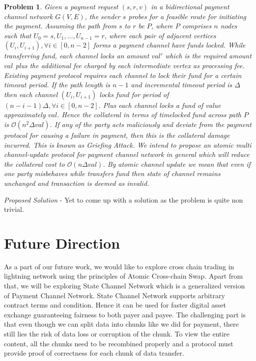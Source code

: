 \documentclass[10pt]{article}
\newtheorem{problem}{\textbf{Problem}}
\begin{document}
\begin{itemize}
\begin{problem}
Given a payment request $(s,r,v)$ in a bidirectional payment channel network $G(V,E)$, the sender $s$ probes for a feasible route for initiating the payment. Assuming the path from $s$ to $r$ be $P$, where $P$ comprises $n$ nodes such that $U_0=s,U_1,\ldots,U_{n-1}=r$, where each pair of adjacent vertices $(U_i,U_{i+1}), \forall i \in [0,n-2]$ forms a payment channel have funds locked. While transferring fund, each channel locks an amount $val'$ which is the required amount $val$ plus the additional fee charged by each intermediate vertex as processing fee. Existing payment protocol requires each channel to lock their fund for a certain timeout period. If the path length is $n-1$ and incremental timeout period is $\Delta$ then each channel $(U_i,U_{i+1})$ locks fund for period of $(n-i-1)\Delta, \forall i \in [0,n-2]$. Plus each channel locks a fund of value approximately $val$. Hence the collateral in terms of timelocked fund across path $P$ is $\mathcal{O}(n^2\Delta val)$. If any of the party acts maliciously and deviate from the payment protocol for causing a failure in payment, then this is the collateral  damage incurred. This is known as \emph{Griefing Attack}. We intend to propose an atomic multi channel-update protocol for payment channel network in general which will reduce the collateral cost to $\mathcal{O}(n\Delta val)$. By atomic channel update we mean that even if one party misbehaves while transfers fund then state of channel remains unchanged and transaction is deemed as invalid.

\end{problem}
\emph{Proposed Solution} - Yet to come up with a solution as the problem is quite non trivial.
\end{itemize}




\section{Future Direction}
As a part of our future work, we would like to explore cross chain trading \cite{atomic} in lightning network using the principles of Atomic Cross-chain Swap. Apart from that, we will be exploring State Channel Network which is a generalized version of Payment Channel Network. State Channel Network supports arbitrary contract terms and condition. Hence it can be used for faster digital asset exchange guaranteeing fairness to both payer and payee. The challenging part is that even though we can split data into
chunks like we did for payment, there still lies the risk of data loss or corruption of the chunk. To view
the entire content, all the chunks need to be recombined properly and a protocol must provide proof
of correctness for each chunk of data transfer. 


\end{document}
